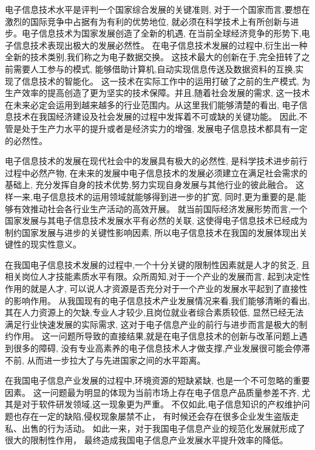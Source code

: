 \documentclass[10pt, conference, compsocconf, a4paper]{IEEEtran}
\begin{document}
电子信息技术水平是评判一个国家综合发展的关键准则,
对于一个国家而言,要想在激烈的国际竞争中占据有为有利的优势地位,
就必须在科学技术上有所创新与进步。电子信息技术为国家发展创造了全新的机遇,
在当前全球经济竞争的形势下,电子信息技术表现出极大的发展必然性。
在电子信息技术发展的过程中,衍生出一种全新的技术类别,我们称之为电子数据交换。\cite{li2009}
这技术最大的创新在于,完全扭转了之前需要人工参与的模式,
能够借助计算机,自动实现信息传送及数据资料的互换,实现了信息技术的智能化。
这一技术在实际工作中的运用打破了之前的生产模式,
为生产效率的提高创造了更为坚实的技术保障。并且,随着社会发展的需求,
这一技术在未来必定会运用到越来越多的行业范围内。从这里我们能够清楚的看出,
电子信息技术在我国经济建设及社会发展的过程中发挥着不可或缺的关键功能。\cite{huang2010}
因此,不管是处于生产力水平的提升或者是经济实力的增强,
发展电子信息技术都具有一定的必然性。\par

电子信息技术的发展在现代社会中的发展具有极大的必然性,
是科学技术进步前行过程中必然产物,
在未来的发展中电子信息技术的发展必须建立在满足社会需求的基础上,
充分发挥自身的技术优势,努力实现自身发展与其他行业的彼此融合。
这样一来,电子信息技术的运用领域就能够得到进一步的扩宽,
同时,更为重要的是,能够有效推动社会各行业生产活动的高效开展。
就当前国际经济发展形势而言,一个国家发展与其电子信息技术发展水平有必然的关联,
这使得电子信息技术已经成为制约国家发展与进步的关键性影响因素,
所以电子信息技术在我国的发展体现出关键性的现实性意义。\par

在我国电子信息技术发展的过程中,一个十分关键的限制性因素就是人才的贫乏,
且相关岗位人才技能素质水平有限。众所周知,对于一个产业的发展而言,
起到决定性作用的就是人才,
可以说人才资源是否充分对于一个产业的发展水平起到了直接性的影响作用。
从我国现有的电子信息技术产业发展情况来看,我们能够清晰的看出,
其在人力资源上的欠缺,专业人才较少,且岗位就业者综合素质较低,
显然已经无法满足行业快速发展的实际需求,
这对于电子信息产业的前行与进步而言是极大的制约作用。\cite{zhou2013}
这一问题所导致的直接结果,就是在电子信息技术的创新与改革问题上遇到很多的障碍,
没有专业高素养的电子信息技术人才做支撑,产业发展很可能会停滞不前,
从而进一步拉大了与先进国家之间的水平距离。\par


在我国电子信息产业发展的过程中,环境资源的短缺紧缺,
也是一个不可忽略的重要因素。
这一问题最为明显的体现为当前市场上存在电子信息产品质量参差不齐,
尤其是对于软件研发领域,这一现象更为严重。
不仅如此,电子信息知识的产权维护问题也存在一定的缺陷,侵权现象屡禁不止，
有时候还会存在很多企业发生盗版走私、出售的行为活动。\cite{hu2013}
如此一来，对于我国电子信息产业的规范化发展就形成了很大的限制性作用，
最终造成我国电子信息产业发展水平提升效率的降低。\par
\end{document}
